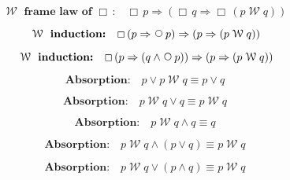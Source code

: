 \documentclass[12pt, fleqn, leqno]{article}
\newcommand{\impl}{\ensuremath{\Rightarrow}}        %
\newcommand{\Wait}{\;\mathcal{W}\;}
\newcommand{\Next}{\;\,\text{\raisebox{3.5pt}{\circle{6}}}}
\newcommand{\Always}{\Box\,}
\newcommand{\spacer}{\vspace{-30pt}}
\begin{document}
\spacer

\begin{equation}\label{E:waitframelawAlways}
\textbf{$\Wait$ frame law of $\Always$:}\quad \Always p \impl (\Always q \impl \Always (p \Wait q))
\end{equation}

\spacer

\begin{equation}\label{E:waitInduct1}
\textbf{$\Wait$ induction:}\quad \Always (p \impl \Next p) \impl  (p \impl (p \Wait q))
\end{equation}

\spacer

\begin{equation}\label{E:waitInduct2}
\textbf{$\Wait$ induction:}\quad \Always (p \impl (q \land \Next p)) \impl  (p \impl (p \Wait q))
\end{equation}

\spacer


\begin{equation}\label{E:waitOrP}
\textbf{Absorption:}\quad p\lor p\Wait q\equiv p\lor q
\end{equation}

\spacer

\begin{equation}\label{E:waitOrQ}
\textbf{Absorption:}\quad p\Wait q\lor q\equiv p\Wait q
\end{equation}

\spacer

\begin{equation}\label{E:waitAndQ}
\textbf{Absorption:}\quad p\Wait q\land q\equiv q
\end{equation}

\spacer

\begin{equation}\label{E:waitAndOr}
\textbf{Absorption:}\quad p\Wait q\land (p\lor q) \equiv p\Wait q
\end{equation}

\spacer

\begin{equation}\label{E:waitOrAnd}
\textbf{Absorption:}\quad p\Wait q\lor (p\land q) \equiv p\Wait q
\end{equation}

\spacer
\end{document}
